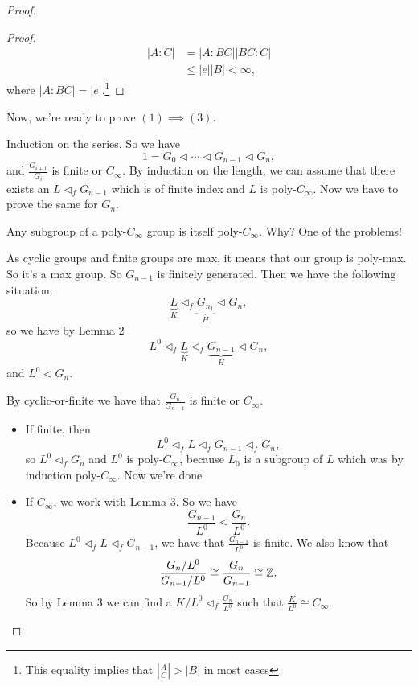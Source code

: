 \begin{proof}
\begin{proof}
        \begin{align*}
            |A :C| &= |A: BC| | BC : C|\\
                   & \le     |e|  | B| < \infty
        ,\end{align*}
        where $|A:BC| = |e|$.\footnote{This equality implies that $|\frac{A}{C}| > |B|$ in most cases}
    \end{proof}

    Now, we're ready to prove $(1) \implies (3)$.

    Induction on the series.
    So we have
    \[
    1 = G_0 \triangleleft \cdots \triangleleft G_{n-1} \triangleleft G_n
    ,\] 
    and $\frac{G_{i+1}}{G_i}$ is finite or $C_\infty$.
    By induction on the length, we can assume that there exists an $L \triangleleft_f G_{n-1}$ which is of finite index and $L$ is poly-$C_\infty$.
    Now we have to prove the same for $G_n$.

    \begin{remark}
       Any subgroup of a poly-$C_\infty$ group is itself poly-$C_\infty$.
        Why? One of the problems!
    \end{remark}


    As cyclic groups and finite groups are max, it means that our group is poly-max.
    So it's a max group.
    So $G_{n-1}$ is finitely generated.
    Then we have the following situation:
    \[
        \underbrace{L}_{K} \triangleleft_f \underbrace{{G_{n_1}}}_{H} \triangleleft G_n
    ,\] 
    so we have by Lemma 2
    \[
        L^{0} \triangleleft_f\underbrace{L}_{K} \triangleleft_f \underbrace{{G_{n-1}}}_{H} \triangleleft G_n
    ,\] 
    and $L^{0} \triangleleft G_n$.

    By cyclic-or-finite we have that $\frac{G_n}{G_{n-1}}$ is finite or $C_\infty$.
    \begin{itemize}
        \item If finite, then
            \[
            L^{0} \triangleleft_f L \triangleleft _f G_{n-1} \triangleleft _f G_n
            ,\] 
            so $L^{0} \triangleleft _f G_{n}$ and $L^{0}$ is poly-$C_{\infty}$, because $ L_0$ is a subgroup of $L$ which was by induction poly-$C_\infty$. Now we're done
        \item If $C_\infty$, we work with Lemma 3.
            So we have
            \[
            \frac{G_{n-1}}{L^{0}} \triangleleft \frac{G_n}{L^{0}}
            .\] 
            Because $L^{0} \triangleleft _f L \triangleleft _f G_{n-1}$, we have that $\frac{G_{n-1}}{ L^{0}}$ is finite.
            We also know that
            \[
            \frac{G_n / L^{0}}{G_{n-1} / L^{0}} \cong \frac{G_n}{G_{n-1}} \cong \mathbb{Z}
            .\]     
            So by Lemma 3 we can find a $K / L^{0} \triangleleft_f \frac{G_n}{L^{0}}$ such that $\frac{K}{L^{0}} \cong C_\infty$.


\end{itemize}
\end{proof}
